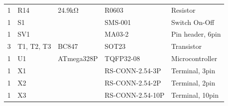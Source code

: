 \documentclass[a4paper, twoside, 12pt, openright
]{memoir}
\begin{document}
\begin{longtable}{lllll}
		1 		& R14 					& 24.9kΩ 			& R0603 			& Resistor \\ 
		1 		& S1 					&					& SMS-001 			& Switch On-Off  \\ 
		1 		& SV1 					&					& MA03-2 			& Pin header, 6pin  \\ 
		3 		& T1, T2, T3 			& BC847 			& SOT23 			& Transistor \\ 
		1 		& U1 					& ATmega328P 		& TQFP32-08 		& Microcontroller \\ 
		1 		& X1 					&					& RS-CONN-2.54-3P 	& Terminal, 3pin  \\ 
		1 		& X2 					&					& RS-CONN-2.54-2P 	& Terminal, 2pin  \\ 
		1 		& X3 					&					& RS-CONN-2.54-10P 	& Terminal, 10pin  \\
	\end{longtable}	
\end{document}

